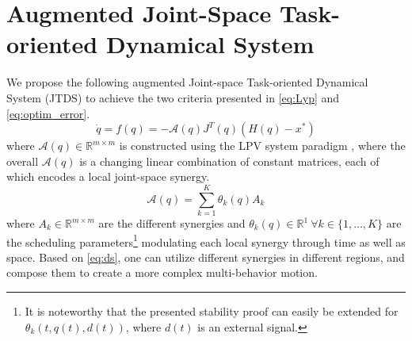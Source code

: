 \documentclass[letterpaper, 10 pt, conference,fleqn]{ieeeconf}
\begin{document}
\section{Augmented \textbf{J}oint-Space \textbf{T}ask-oriented \textbf{D}ynamical \textbf{S}ystem} \label{Sec:DS}
\label{sec:proposed_system}
We propose the following augmented Joint-space Task-oriented Dynamical System (JTDS) to achieve the two criteria presented in \eqref{eq:Lyp} and \eqref{eq:optim_error}.
\begin{equation}
\label{eq:ds}
\dot{q} = f(q) = -\mathcal{A}(q)J^T(q)(H(q) - x^*)
\end{equation}
where  $\mathcal{A}(q)\in \mathbb{R}^{m\times m}$ is constructed using the LPV system paradigm \cite{emedi2016fixed,7439839}, where the overall $\mathcal{A}(q)$ is a changing linear combination of constant  matrices, each of which encodes a local joint-space synergy. 
\begin{equation}
\label{eq:A_def}
\mathcal{A}(q) = \sum_{k=1}^{K}\theta_k(q)A_k 
\end{equation}
where $A_k\in \mathbb{R}^{m\times m} $ are the different synergies and $\theta_k(q)\in \mathbb{R}^{1}~\forall k\in\{1,\dots,K\} $ are the scheduling parameters\footnote{%
It is noteworthy that the presented stability proof can easily be extended for $\theta_k (t, q(t), d(t))$, where $d(t)$ is an external signal.} modulating each local synergy through time as well as space. Based on \eqref{eq:ds}, one can utilize different synergies in different regions, and compose them to create a more complex multi-behavior motion.
\end{document}
